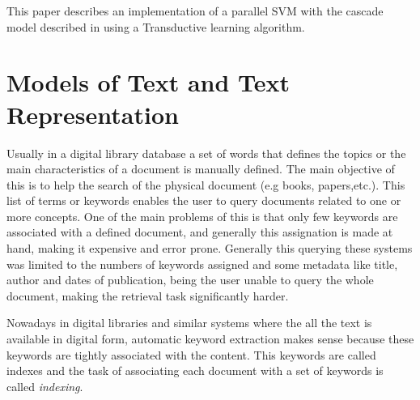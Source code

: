 
This paper describes an implementation of a parallel SVM with the
cascade model described in \cite{GrafCBDV04} using a Transductive
learning algorithm. 


%
\section{Models of Text and Text Representation\label{sub:Models-of-Text}}
%

Usually in a digital library database a set of words that defines
the topics or the main characteristics of a document is manually defined.
The main objective of this is to help the search of the physical document
(e.g books, papers,etc.). This list of terms or keywords enables the
user to query documents related to one or more concepts. One of the
main problems of this is that only few keywords are associated with
a defined document, and generally this assignation is made at hand,
making it expensive and error prone. Generally this querying these
systems was limited to the numbers of keywords assigned and some metadata
like title, author and dates of publication, being the user unable
to query the whole document, making the retrieval task significantly
harder.

Nowadays in digital libraries and similar systems where the all the
text is available in digital form, automatic keyword extraction makes
sense because these keywords are tightly associated with the content.
This keywords are called indexes and the task of associating each
document with a set of keywords is called \emph{indexing}. 

